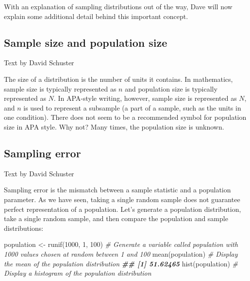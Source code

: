 \documentclass[
]{book}
\newenvironment{Shaded}{\begin{snugshade}}{\end{snugshade}}
\newcommand{\CommentTok}[1]{\textcolor[rgb]{0.56,0.35,0.01}{\textit{#1}}}
\newcommand{\DecValTok}[1]{\textcolor[rgb]{0.00,0.00,0.81}{#1}}
\newcommand{\DocumentationTok}[1]{\textcolor[rgb]{0.56,0.35,0.01}{\textbf{\textit{#1}}}}
\newcommand{\FunctionTok}[1]{\textcolor[rgb]{0.00,0.00,0.00}{#1}}
\newcommand{\NormalTok}[1]{#1}
\newcommand{\OtherTok}[1]{\textcolor[rgb]{0.56,0.35,0.01}{#1}}
\begin{document}
With an explanation of sampling distributions out of the way, Dave will now explain some additional detail behind this important concept.

\hypertarget{sample-size-and-population-size}{%
\subsection{Sample size and population size}\label{sample-size-and-population-size}}

Text by David Schuster

The size of a distribution is the number of units it contains. In mathematics, sample size is typically represented as \(n\) and population size is typically represented as \(N\). In APA-style writing, however, sample size is represented as \(N\), and \(n\) is used to represent a subsample (a part of a sample, such as the units in one condition). There does not seem to be a recommended symbol for population size in APA style. Why not? Many times, the population size is unknown.

\hypertarget{sampling-error}{%
\subsection{Sampling error}\label{sampling-error}}

Text by David Schuster

Sampling error is the mismatch between a sample statistic and a population parameter. As we have seen, taking a single random sample does not guarantee perfect representation of a population. Let's generate a population distribution, take a single random sample, and then compare the population and sample distributions:

\begin{Shaded}
\begin{Highlighting}[]
\NormalTok{population }\OtherTok{\textless{}{-}} \FunctionTok{runif}\NormalTok{(}\DecValTok{1000}\NormalTok{, }\DecValTok{1}\NormalTok{, }\DecValTok{100}\NormalTok{) }\CommentTok{\# Generate a variable called \textquotesingle{}population\textquotesingle{} with 1000 values chosen at random between 1 and 100}
\FunctionTok{mean}\NormalTok{(population) }\CommentTok{\# Display the mean of the population distribution}
\DocumentationTok{\#\# [1] 51.62465}
\FunctionTok{hist}\NormalTok{(population) }\CommentTok{\# Display a histogram of the population distribution}
\end{Highlighting}
\end{Shaded}
\end{document}
